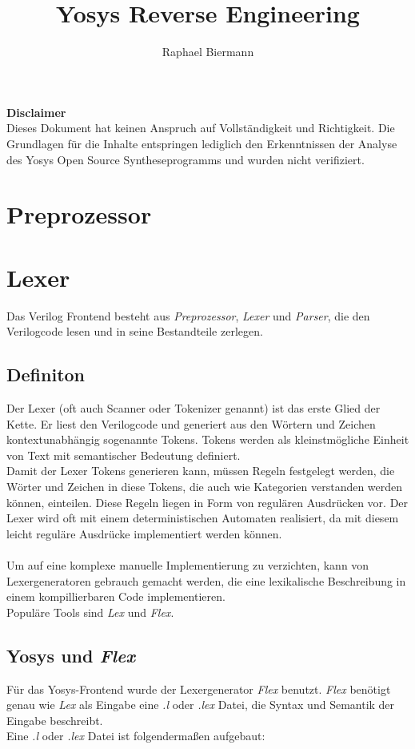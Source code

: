 \documentclass[11pt]{report}
\author{Raphael Biermann}
\title{Yosys Reverse Engineering}
\begin{document}
\maketitle
\tableofcontents
\newpage
\textbf{Disclaimer}
\\
Dieses Dokument hat keinen Anspruch auf Vollständigkeit und Richtigkeit. Die Grundlagen für die Inhalte entspringen lediglich den Erkenntnissen der Analyse des Yosys Open Source Syntheseprogramms und wurden nicht verifiziert.
\newpage
\chapter{Preprozessor}
\chapter{Lexer}
Das Verilog Frontend besteht aus \textit{Preprozessor}, \textit{Lexer} und \textit{Parser}, die den Verilogcode lesen und in seine Bestandteile zerlegen.
\section{Definiton}
Der Lexer (oft auch Scanner oder Tokenizer genannt) ist das erste Glied der Kette. Er liest den Verilogcode und generiert aus den Wörtern und Zeichen kontextunabhängig sogenannte Tokens. Tokens werden als kleinstmögliche Einheit von Text mit semantischer Bedeutung definiert.\\
Damit der Lexer Tokens generieren kann, müssen Regeln festgelegt werden, die Wörter und Zeichen in diese Tokens, die auch wie Kategorien verstanden werden können, einteilen. Diese Regeln liegen in Form von regulären Ausdrücken vor.
Der Lexer wird oft mit einem deterministischen Automaten realisiert, da mit diesem leicht reguläre Ausdrücke implementiert werden können.\\
\\
Um auf eine komplexe manuelle Implementierung zu verzichten, kann von Lexergeneratoren gebrauch gemacht werden, die eine lexikalische Beschreibung in einem kompillierbaren Code implementieren.\\
Populäre Tools sind \textit{Lex} und \textit{Flex}.

\section{Yosys und \textit{Flex}}
Für das Yosys-Frontend wurde der Lexergenerator \textit{Flex} benutzt. \textit{Flex} benötigt genau wie \textit{Lex} als Eingabe eine \textit{.l} oder \textit{.lex} Datei, die Syntax und Semantik der Eingabe beschreibt.\\
Eine \textit{.l} oder \textit{.lex} Datei ist folgendermaßen aufgebaut:\\
\end{document}
